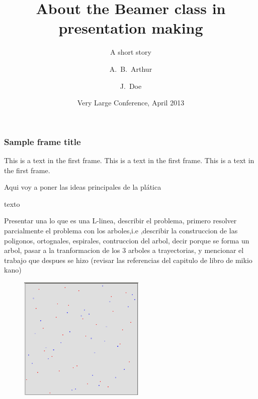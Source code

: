 \documentclass{beamer}
\title[About Beamer] %
{About the Beamer class in presentation making}
\subtitle{A short story}
\author[Arthur, Doe] %
{A.~B.~Arthur\inst{1} \and J.~Doe\inst{2}}
\institute[VFU] %
{
  \inst{1}%
  Faculty of Physics\\
  Very Famous University
  \and
  \inst{2}%
  Faculty of Chemistry\\
  Very Famous University
}
\date[VLC 2013] %
{Very Large Conference, April 2013}
\begin{document}
\frame{\titlepage}

\begin{frame}
\frametitle{Sample frame title}
This is a text in the first frame. This is a text in the first frame. This is a text in the first frame.
\end{frame}

\begin{frame}
 Aqui voy a poner las ideas principales de la plática \pause

texto \pause

Presentar una lo que es una L-linea, describir el problema, primero resolver parcialmente el problema con los arboles,i.e ,describir la construccion de las poligonos, ortognales, espirales, contruccion del arbol, decir porque se forma un arbol, pasar a la tranformacion de los 3 arboles a trayectorias, y mencionar el trabajo que despues se hizo (revisar las referencias del capitulo de libro de mikio kano)
\end{frame}
\begin{figure}[b]
\begin{center}
\includegraphics[width=6cm, height=6cm]{n-puntos}
\end{center}
\end{figure}
\end{document}

